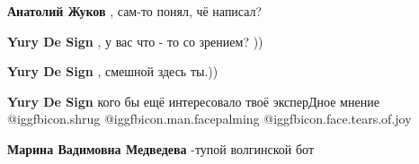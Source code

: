 \begin{itemize}
\begin{itemize}
\textbf{Анатолий Жуков} , сам-то понял, чё написал?

\textbf{Yury De Sign} , у вас что - то со зрением? ))

\textbf{Yury De Sign} , смешной здесь ты.))

\textbf{Yury De Sign} кого бы ещё интересовало твоё эксперДное мнение @igg{fbicon.shrug}  @igg{fbicon.man.facepalming}  @igg{fbicon.face.tears.of.joy} 

\textbf{Марина Вадимовна Медведева} -тупой волгинской бот
\end{itemize} %

\end{itemize} %
